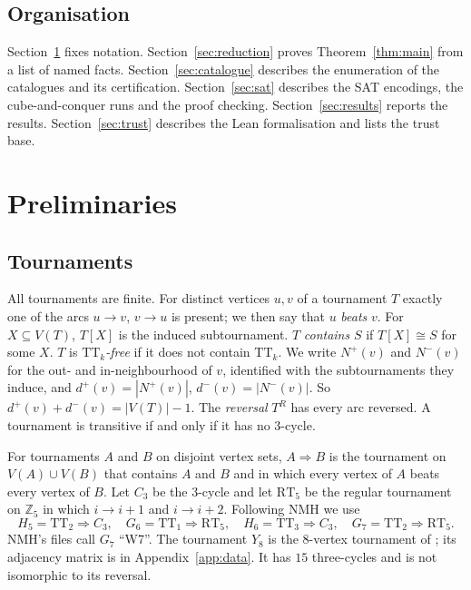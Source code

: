 \documentclass[11pt]{amsart}
\theoremstyle{definition}
\theoremstyle{remark}
\newcommand{\TT}[1]{\mathrm{TT}_{#1}}
\newcommand{\RT}{\mathrm{RT}_5}
\newcommand{\dom}{\Rightarrow}
\newcommand{\Np}{N^{+}}
\newcommand{\Nm}{N^{-}}
\newcommand{\dpl}{d^{+}}
\newcommand{\dmi}{d^{-}}
\begin{document}
\subsection*{Organisation}
Section~\ref{sec:prelim} fixes notation. Section~\ref{sec:reduction} proves
Theorem~\ref{thm:main} from a list of named facts. Section~\ref{sec:catalogue}
describes the enumeration of the catalogues and its certification.
Section~\ref{sec:sat} describes the SAT encodings, the cube-and-conquer runs
and the proof checking. Section~\ref{sec:results} reports the results.
Section~\ref{sec:trust} describes the Lean formalisation and lists the trust
base.

\section{Preliminaries}\label{sec:prelim}

\subsection{Tournaments}
All tournaments are finite. For distinct vertices $u,v$ of a tournament $T$
exactly one of the arcs $u\to v$, $v\to u$ is present; we then say that $u$
\emph{beats} $v$. For $X \subseteq V(T)$, $T[X]$ is the induced
subtournament. $T$ \emph{contains} $S$ if $T[X] \cong S$ for some $X$.
$T$ is \emph{$\TT{k}$-free} if it does not contain $\TT{k}$. We write
$\Np(v)$ and $\Nm(v)$ for the out- and in-neighbourhood of $v$, identified
with the subtournaments they induce, and $\dpl(v)=|\Np(v)|$,
$\dmi(v)=|\Nm(v)|$. So $\dpl(v)+\dmi(v)=|V(T)|-1$. The \emph{reversal}
$T^{R}$ has every arc reversed. A tournament is transitive if and only if it
has no $3$-cycle.

For tournaments $A$ and $B$ on disjoint vertex sets, $A \dom B$ is the
tournament on $V(A)\cup V(B)$ that contains $A$ and $B$ and in which every
vertex of $A$ beats every vertex of $B$. Let $C_3$ be the $3$-cycle and let
$\RT$ be the regular tournament on $\mathbb{Z}_5$ in which $i \to i+1$ and
$i \to i+2$. Following NMH we use
\[
H_5 = \TT{2} \dom C_3,\quad G_6 = \TT{1} \dom \RT,\quad
H_6 = \TT{3} \dom C_3,\quad G_7 = \TT{2} \dom \RT .
\]
NMH's files call $G_7$ ``W7''. The tournament $Y_8$ is the $8$-vertex
tournament of \cite[Fig.~5]{NMH22}; its adjacency matrix is in
Appendix~\ref{app:data}. It has $15$ three-cycles and is not isomorphic to its
reversal.
\end{document}
